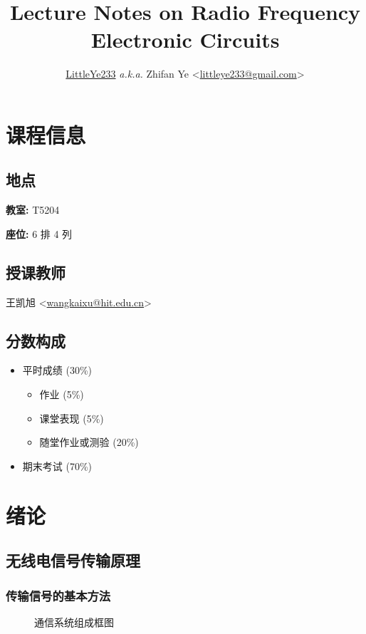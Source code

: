 \documentclass{notes}
\title{Lecture Notes on Radio Frequency Electronic Circuits}
\author{\href{https://github.com/LittleYe233}{LittleYe233} \textit{a.k.a.} Zhifan Ye <\href{mailto:littleye233@gmail.com}{littleye233@gmail.com}>}
\begin{document}
\maketitle
\tableofcontents
\newpage

\section*{课程信息} \label{课程信息}

\subsection{地点}
\textbf{教室:} T5204 \par
\textbf{座位:} 6 排 4 列

\subsection{授课教师}
王凯旭 <\href{mailto:wangkaixu@hit.edu.cn}{wangkaixu@hit.edu.cn}>

\subsection{分数构成}
\begin{itemize}
    \item 平时成绩 (30\%)
          \begin{itemize}
              \item 作业 (5\%)
              \item 课堂表现 (5\%)
              \item 随堂作业或测验 (20\%)
          \end{itemize}
    \item 期末考试 (70\%)
\end{itemize}

\section{绪论} \label{绪论}
\subsection{无线电信号传输原理}
\subsubsection{传输信号的基本方法}
\begin{figure}[H]
    \centering
    \caption{通信系统组成框图}
\end{figure}
\end{document}
